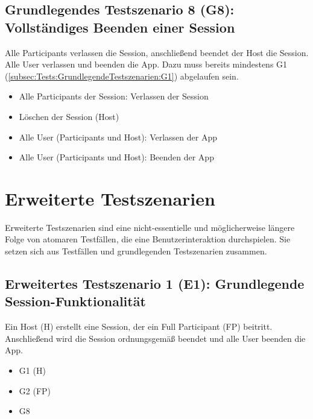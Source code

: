 \documentclass[oneside, ngerman]{sdqtechreport}
\begin{document}
\subsection{Grundlegendes Testszenario 8 (G8): Vollständiges Beenden einer Session}
\label{subsec:Tests:GrundlegendeTestszenarien:G8}
Alle Participants verlassen die Session, anschließend beendet der Host die Session. Alle User verlassen und beenden die App.
Dazu muss bereits mindestens G1 (\ref{subsec:Tests:GrundlegendeTestszenarien:G1}) abgelaufen sein.
\begin{itemize}
    \item Alle Participants der Session: Verlassen der Session
    \item Löschen der Session (Host)
    \item Alle User (Participants und Host): Verlassen der App
    \item Alle User (Participants und Host): Beenden der App
\end{itemize}


\section{Erweiterte Testszenarien}
\label{sec:Tests:ErweiterteTestszenarien}

Erweiterte Testszenarien sind eine nicht-essentielle und möglicherweise längere Folge von atomaren Testfällen, die eine Benutzerinteraktion durchspielen. Sie setzen sich aus Testfällen und grundlegenden Testszenarien zusammen.


\subsection{Erweitertes Testszenario 1 (E1): Grundlegende Session-Funktionalität}
\label{subsec:Tests:ErweiterteTestszenarien:E1}
Ein Host (H) erstellt eine Session, der ein Full Participant (FP) beitritt. Anschließend wird die Session ordnungsgemäß beendet und alle User beenden die App.
\begin{itemize}
    \item G1 (H)
    \item G2 (FP)
    \item G8
\end{itemize}
\end{document}
